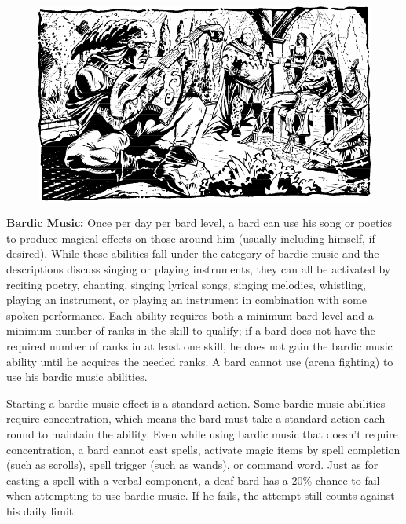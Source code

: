 \begin{figure}[t!]
\centering
\includegraphics[width=\textwidth]{images/bard-2.png}
\WOTC
\end{figure}

\textbf{Bardic Music:} Once per day per bard level, a bard can use his song or poetics to produce magical effects on those around him (usually including himself, if desired). While these abilities fall under the category of bardic music and the descriptions discuss singing or playing instruments, they can all be activated by reciting poetry, chanting, singing lyrical songs, singing melodies, whistling, playing an instrument, or playing an instrument in combination with some spoken performance. Each ability requires both a minimum bard level and a minimum number of ranks in the  skill to qualify; if a bard does not have the required number of ranks in at least one  skill, he does not gain the bardic music ability until he acquires the needed ranks. A bard cannot use  (arena fighting) to use his bardic music abilities.

Starting a bardic music effect is a standard action. Some bardic music abilities require concentration, which means the bard must take a standard action each round to maintain the ability. Even while using bardic music that doesn't require concentration, a bard cannot cast spells, activate magic items by spell completion (such as scrolls), spell trigger (such as wands), or command word. Just as for casting a spell with a verbal component, a deaf bard has a 20\% chance to fail when attempting to use bardic music. If he fails, the attempt still counts against his daily limit.


